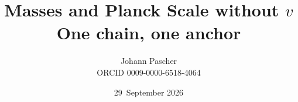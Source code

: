 \documentclass[11pt,a4paper]{report}
\title{Masses and Planck Scale without $v$\\[0.5em]
  \large One chain, one anchor}
\date{29~September 2026}
\author{Johann Pascher\\\small ORCID 0009-0000-6518-4064}
\begin{document}
\renewcommand{\thechapter}{}
\renewcommand{\thesection}{\arabic{section}}
\maketitle
\tableofcontents

\end{document}
